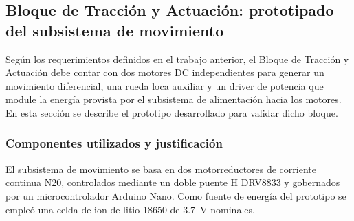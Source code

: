 \documentclass[12pt,a4paper]{article}
\begin{document}
\subsection{Bloque de Tracción y Actuación: prototipado del subsistema de movimiento}
Según los requerimientos definidos en el trabajo anterior, el Bloque de Tracción y Actuación debe contar con dos motores DC independientes para generar un movimiento diferencial, una rueda loca auxiliar y un driver de potencia que module la energía provista por el subsistema de alimentación hacia los motores. En esta sección se describe el prototipo desarrollado para validar dicho bloque.

\subsubsection{Componentes utilizados y justificación}
El subsistema de movimiento se basa en dos motorreductores de corriente continua N20, controlados mediante un doble puente H DRV8833 y gobernados por un microcontrolador Arduino Nano. Como fuente de energía del prototipo se empleó una celda de ion de litio 18650 de \SI{3,7}{V} nominales.
\end{document}
